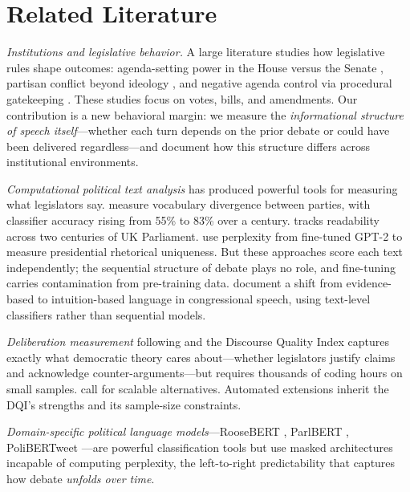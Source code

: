 \documentclass[12pt]{article}
\begin{document}
\section{Related Literature}

\textit{Institutions and legislative behavior.} A large literature studies how legislative rules shape outcomes: agenda-setting power in the House versus the Senate \citep{perssonTabellini2000, perssonTabellini2003}, partisan conflict beyond ideology \citep{lee2009}, and negative agenda control via procedural gatekeeping \citep{jenkins2006}. These studies focus on votes, bills, and amendments. Our contribution is a new behavioral margin: we measure the \textit{informational structure of speech itself}---whether each turn depends on the prior debate or could have been delivered regardless---and document how this structure differs across institutional environments.

\textit{Computational political text analysis} has produced powerful tools for measuring what legislators say. \citet{gentzkow2019} measure vocabulary divergence between parties, with classifier accuracy rising from 55\% to 83\% over a century. \citet{spirling2016} tracks readability across two centuries of UK Parliament. \citet{zhou2024} use perplexity from fine-tuned GPT-2 to measure presidential rhetorical uniqueness. But these approaches score each text independently; the sequential structure of debate plays no role, and fine-tuning carries contamination from pre-training data. \citet{aroyehun2025} document a shift from evidence-based to intuition-based language in congressional speech, using text-level classifiers rather than sequential models.

\textit{Deliberation measurement} following \citet{steiner2004} and the Discourse Quality Index captures exactly what democratic theory cares about---whether legislators justify claims and acknowledge counter-arguments---but requires thousands of coding hours on small samples. \citet{bachtiger2019} call for scalable alternatives. Automated extensions \citep{fournierTombs2021, flores2024} inherit the DQI's strengths and its sample-size constraints.

\textit{Domain-specific political language models}---RooseBERT \citep{evrard2025}, ParlBERT \citep{klamm2022}, PoliBERTweet \citep{kawintiranon2022}---are powerful classification tools but use masked architectures incapable of computing perplexity, the left-to-right predictability that captures how debate \textit{unfolds over time}.
\end{document}
